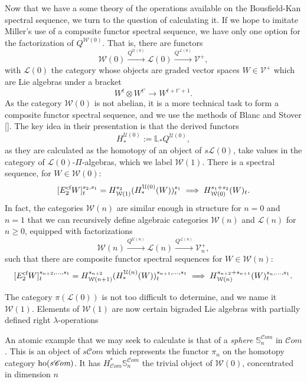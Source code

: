 \documentclass[11pt]{amsart} \renewcommand{\baselinestretch}{1.4}
\theoremstyle{plain}
\theoremstyle{definition}
\renewcommand{\to}{\longrightarrow}
\newcommand{\scrC}{\mathscr{C}}
\newcommand{\calV}{\mathcal{V}}
\newcommand{\calw}{\mathcal{W}}
\newcommand{\calu}{\mathcal{U}}
\newcommand{\call}{\mathcal{L}}
\newcommand{\vect}[2]{\calV^{#1}_{#2}}
\newcommand{\PA}[1]{\pi#1}
\newcommand{\algs}{{\scrC\!\textit{om}}}
\newcommand{\E}[5]{[E^{#1}_{#2}#3]^{#4}_{#5}}
\begin{document}
\begin{Introduction}
Now that we have a some theory of the operations available on the Bousfield-Kan spectral sequence, we turn to the question of calculating it. If we hope to imitate Miller's use of a composite functor spectral sequence, we have only one option for the factorization of $Q^{\calw(0)}$. That is, there are functors
\[\calw(0)\overset{Q^{\calu(0)}}{\to}\call(0)\overset{Q^{\call(0)}}{\to}\vect{+}{},\]
with $\call(0)$ the category whose objects are graded vector spaces $W\in\vect{+}{}$ which are Lie algebras under a bracket
\[W^{t}\otimes W^{t'}\to W^{t+t'+1}.\]
As the category $\calw(0)$ is not abelian, it is a more technical task to form a composite functor spectral sequence, and we use the methods of Blanc and Stover []. The key idea in their presentation is that the derived functors
\[H_*^{\calu(0)}:=\mathbb{L}_*Q^{\calu(0)},\]
as they are calculated as the homotopy of an object of $s\call(0)$, take values in the category  of $\call(0)$-$\Pi$-algebras, which we label $\calw(1)$. There is a spectral sequence, for $W\in\calw(0)$:
\[\E{\textup{cf}}{2}{W}{s_2,s_1}{t}=H^{s_2}_{\calw(1)}(H_*^{\calu(0)}(W))^{s_1}_t\implies H^{s_1+s_2}_{\calw(0)} (W)_t.\]
In fact, the categories $\calw(n)$ are similar enough in structure for $n=0$ and $n=1$ that we can recursively define algebraic categories $\calw(n)$ and $\call(n)$ for $n\geq0$, equipped with factorizations 
\[\calw(n)\overset{Q^{\calu(n)}}{\to}\call(n)\overset{Q^{\call(n)}}{\to}\vect{+}{n},\]
such that there are composite functor spectral sequences for $W\in\calw(n)$:
\[\E{\textup{cf}}{2}{W}{s_{n+2},\ldots,s_1}{t}=H^{s_{n+2}}_{\calw(n+1)}(H_*^{\calu(n)}(W))^{s_{n+1},\ldots,s_1}_t\implies H^{s_{n+2}+s_{n+1}}_{\calw(n)} (W)_t^{s_n,\ldots,s_1}.\]




The category $\PA{(\call(0))}$ is not too difficult to determine, and we name it $\calw(1)$. Elements of $\calw(1)$ are now certain bigraded Lie algebras with partially defined right $\lambda$-operations





An atomic example that we may seek to calculate is that of a \emph{sphere} $\mathbb{S}_n^{\algs} $ in $\algs$. This is an object of $s\algs$ which represents the functor $\pi_n$ on the homotopy category $\textup{ho}(s\algs)$. It has $H^*_{\algs}\mathbb{S}_n^{\algs}$ the trivial object of $\calw(0)$, concentrated in dimension $n$




\end{Introduction}
\end{document}
